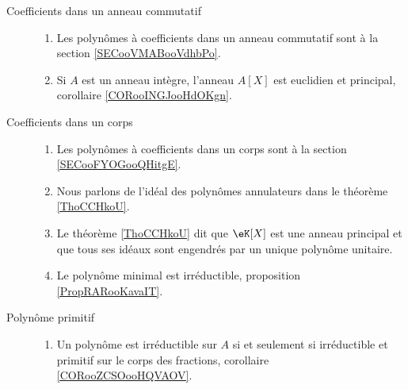 
\begin{description}
    \item[Coefficients dans un anneau commutatif]

        \begin{enumerate}
            \item
Les polynômes à coefficients dans un anneau commutatif  sont à la section \ref{SECooVMABooVdhbPo}.
\item Si \( A\) est un anneau intègre, l'anneau \( A[X]\) est euclidien et principal, corollaire \ref{CORooINGJooHdOKgn}.
        \end{enumerate}
        

    \item[Coefficients dans un corps]
        \begin{enumerate}
            \item
                
Les polynômes à coefficients dans un corps sont à la section \ref{SECooFYOGooQHitgE}.
\item
Nous parlons de l'idéal des polynômes annulateurs dans le théorème \ref{ThoCCHkoU}.
            \item
                Le théorème \ref{ThoCCHkoU} dit que \( \eK[X]\) est une anneau principal et que tous ses idéaux sont engendrés par un unique polynôme unitaire.
            \item
                Le polynôme minimal est irréductible, proposition \ref{PropRARooKavaIT}.
        \end{enumerate}
    \item[Polynôme primitif]
    
        \begin{enumerate}
            \item
                Un polynôme est irréductible sur \( A\) si et seulement si irréductible et primitif sur le corps des fractions, corollaire \ref{CORooZCSOooHQVAOV}.
        \end{enumerate}

\end{description}



